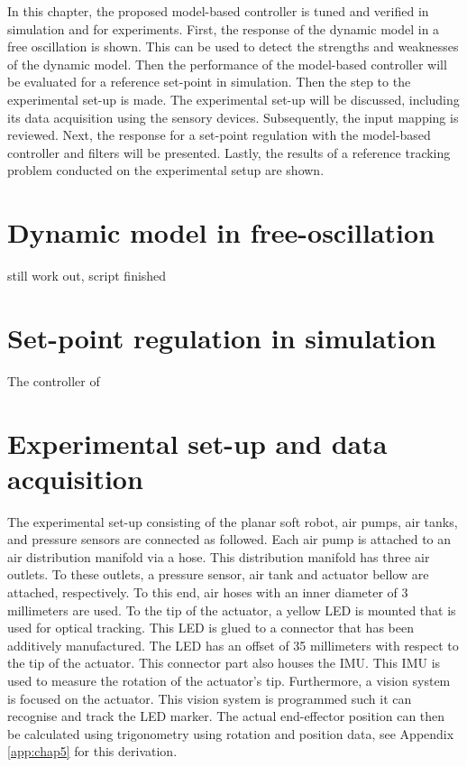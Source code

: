 \label{chap5}

In this chapter, the proposed model-based controller is tuned and verified in simulation and for experiments. First, the response of the dynamic model in a free oscillation is shown. This can be used to detect the strengths and weaknesses of the dynamic model. Then the performance of the model-based controller will be evaluated for a reference set-point in simulation. Then the step to the experimental set-up is made. The experimental set-up will be discussed, including its data acquisition using the sensory devices. Subsequently, the input mapping is reviewed. Next, the response for a set-point regulation with the model-based controller and filters will be presented. Lastly, the results of a reference tracking problem conducted on the experimental setup are shown. 



\section{Dynamic model in free-oscillation}

still work out, script finished

\section{Set-point regulation in simulation}

The controller of 


\section{Experimental set-up and data acquisition}

The experimental set-up consisting of the planar soft robot, air pumps, air tanks, and pressure sensors are connected as followed. Each air pump is attached to an air distribution manifold via a hose. This distribution manifold has three air outlets. To these outlets, a pressure sensor, air tank and actuator bellow are attached, respectively. To this end, air hoses with an inner diameter of 3 millimeters are used. To the tip of the actuator, a yellow LED is mounted that is used for optical tracking. This LED is glued to a connector that has been additively manufactured. The LED has an offset of 35 millimeters with respect to the tip of the actuator. This connector part also houses the IMU. This IMU is used to measure the rotation of the actuator's tip. Furthermore, a vision system is focused on the actuator. This vision system is programmed such it can recognise and track the LED marker. The actual end-effector position can then be calculated using trigonometry using rotation and position data, see Appendix \ref{app:chap5} for this derivation. 

